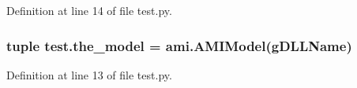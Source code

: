 Definition at line 14 of file test.\+py.

\hypertarget{namespacetest_a353d01c7c783fd0d6d6287c760facb41}{}
\subsubsection[{the\+\_\+model}]{\setlength{\rightskip}{0pt plus 5cm}tuple test.\+the\+\_\+model = ami.\+A\+M\+I\+Model({\bf g\+D\+L\+L\+Name})}\label{namespacetest_a353d01c7c783fd0d6d6287c760facb41}


Definition at line 13 of file test.\+py.

